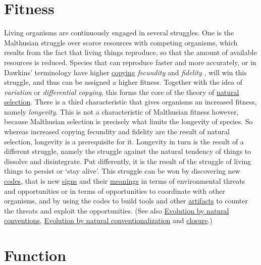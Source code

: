 \documentclass[12pt]{article}
\begin{document}
\section{Fitness}
Living organisms are continuously engaged in several struggles. One is
the Malthusian struggle over scarce resources with competing
organisms, which results from the fact that living things reproduce,
so that the amount of available resources is reduced. Species that can
reproduce faster and more accurately, or in Dawkins' terminology have
higher \hyperlink{copying_and_coding}{copying} {\em fecundity} and
{\em fidelity} \cite{Dawkins:selfish_gene}, will win this struggle,
and thus can be assigned a higher fitness. Together with the idea of
{\em variation} or {\em differential copying}, this forms the core of
the theory of \hyperlink{natural_selection}{natural selection}.  There
is a third characteristic that gives organisms an increased fitness,
namely {\em longevity}. This is not a characteristic of Malthusian
fitness however, because Malthusian selection is precisely what limits
the longevity of species. So whereas increased copying fecundity and
fidelity are the result of natural selection, longevity is a
prerequisite for it.  Longevity in turn is the result of a different
struggle, namely the struggle against the natural tendency of things
to dissolve and disintegrate. Put differently, it is the result of
the struggle of living things to persist or `stay alive'. This
struggle can be won by discovering new
\hyperlink{copying_and_coding}{codes}, that is new
\hyperlink{signs}{signs} and their \hyperlink{meaning}{meanings} in
terms of environmental threats and opportunities or in terms of
opportunities to coordinate with other organisms, and by using the
codes to build tools and other \hyperlink{artifacts}{artifacts} to
counter the threats and exploit the opportunities. (See also
\hyperlink{natural_conventions}{Evolution by natural conventions},
\hyperlink{natural_conventionalization}{Evolution by natural conventionalization} and
\hyperlink{closure}{closure}.)

\hypertarget{function}{}
\section{Function}
\end{document}
